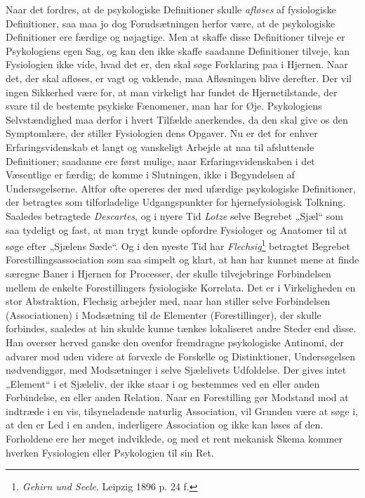 \documentclass[12pt,a4paper]{book}
\newcommand{\apage}[1]{\marginnote{\footnotesize\textit{[#1]}}}
\begin{document}
Naar det fordres, at de psykologiske Definitioner skulle \emph{afløses} af fysiologiske Definitioner, saa maa jo dog Forudsætningen herfor være,
at de psykologiske Definitioner ere færdige og nøjagtige. Men at
skaffe disse Definitioner tilveje er Psykologiens egen Sag, og kan den
ikke skaffe saadanne Definitioner tilveje, kan Fysiologien ikke vide,
hvad det er, den skal søge Forklaring paa i Hjernen. Naar det, der
skal afløses, er vagt og vaklende, maa Afløsningen blive derefter. Der
vil ingen Sikkerhed være for, at man virkeligt har fundet de
Hjernetilstande, der svare til de bestemte psykiske Fænomener, man har
for Øje. Psykologiens Selvstændighed maa derfor i hvert Tilfælde
anerkendes, da den skal give os den Symptomlære, der stiller
Fysiologien dens Opgaver. Nu er det for enhver Erfaringsvidenskab et
langt og vanskeligt Arbejde at naa til afsluttende Definitioner;
saadanne ere først mulige, naar Erfaringsvidenskaben i det Væsentlige
er færdig; de komme i Slutningen, ikke i Begyndelsen af
Undersøgelserne. Altfor ofte opereres der med ufærdige psykologiske
Definitioner, der betragtes som tilforladelige Udgangspunkter for
hjernefysiologisk Tolkning. Saaledes betragtede \emph{Descartes}, og i
nyere Tid \emph{Lotze} selve Begrebet „Sjæl“ som saa tydeligt og fast,
at man trygt kunde opfordre Fysiologer og Anatomer til at søge efter
„Sjælens Sæde“. Og i den nyeste Tid har \emph{Flechsig}\footnote{\emph{Gehirn
und Seele}. Leipzig 1896 p. 24 f.} betragtet Begrebet
Forestillingsassociation som saa simpelt og klart, at han har kunnet
mene at finde særegne Baner i Hjernen for Processer, der skulle
tilvejebringe Forbindelsen mellem de enkelte Forestillingers
fysiologiske Korrelata. Det er i Virkeligheden en stor Abstraktion,
Flechsig arbejder med, naar han stiller selve Forbindelsen
(Associationen) i Modsætning til de Elementer (Forestillinger), der
skulle \apage{26} forbindes, saaledes at hin skulde kunne tænkes lokaliseret
andre Steder end disse. Han overser herved ganske den ovenfor
fremdragne psykologiske Antinomi, der advarer mod uden videre at
forvexle de Forskelle og Distinktioner, Undersøgelsen nødvendiggør, med
Modsætninger i selve Sjælelivets Udfoldelse. Der gives intet „Element“
i et Sjæleliv, der ikke staar i og bestemmes ved en eller anden
Forbindelse, en eller anden Relation. Naar en Forestilling gør
Modstand mod at indtræde i en vis, tilsyneladende naturlig
Association, vil Grunden være at søge i, at den er Led i en anden,
inderligere Association og ikke kan løses af den. Forholdene ere her
meget indviklede, og med et rent mekanisk Skema kommer hverken
Fysiologien eller Psykologien til sin Ret.
\end{document}
